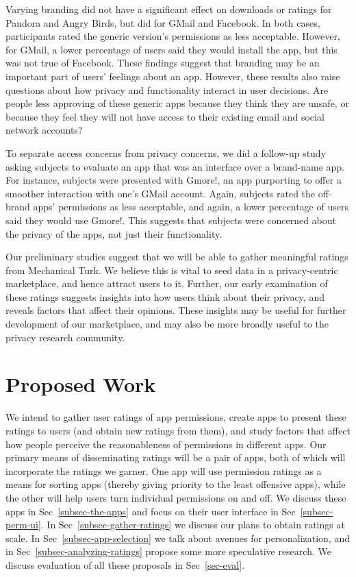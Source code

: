 \documentclass[11pt]{article}
\begin{document}
Varying branding did not have a significant effect on downloads or
ratings for Pandora and Angry Birds, but did 
for GMail and Facebook. In both cases,
participants rated the generic version's permissions as less
acceptable. However, for GMail, a lower percentage of users said they
would install the app, but this was not true of Facebook.  These
findings suggest that branding may be an important part of users'
feelings about an app. However, these results also raise questions
about how privacy and functionality interact in user decisions. Are
people less approving of these generic apps because they think they
are unsafe, or because they feel they will not have access to their
existing email and social network accounts?

To separate access concerns from privacy concerns, we did a follow-up
study asking subjects to evaluate an app that was an
interface over a brand-name app. For instance,
subjects were presented with Gmore!, an app purporting to offer a
smoother interaction with one's GMail account. Again, subjects rated
the off-brand apps' permissions as less acceptable, and again, a lower
percentage of users said they would use Gmore!. This suggests that
subjects were concerned about the privacy of the apps, not just their
functionality.

Our preliminary studies suggest that we will be able to gather
meaningful ratings from Mechanical Turk. We believe this is vital
to seed data in a privacy-centric marketplace, and hence attract users
to it. Further, our early examination of these ratings 
suggests insights into how users think about their privacy, and reveals
factors that affect their opinions. These insights may be useful for
further development of our marketplace, and may also be more broadly
useful to the privacy research community.

\section{Proposed Work}

We intend to gather user ratings of app permissions, create apps to present these ratings
to users (and obtain new ratings from them), and study factors that
affect how people perceive the reasonableness of permissions in
different apps. Our primary means of disseminating ratings will be
a pair of apps, both of which will incorporate the ratings we
garner. One app will use permission ratings as a means for sorting
apps (thereby giving priority to the least offensive apps),
while the other will help users turn individual permissions on and
off. We discuss these apps in Sec~\ref{subsec-the-apps} and focus on 
their user interface in Sec~\ref{subsec-perm-ui}. In Sec~\ref{subsec-gather-ratings} 
we discuss our plans to obtain ratings at scale. In
Sec~\ref{subsec-app-selection} we talk about avenues for personalization, and in
Sec~\ref{subsec-analyzing-ratings} propose
some more speculative research.  We discuss evaluation of all these
proposals in Sec~\ref{sec-eval}.
\end{document}
